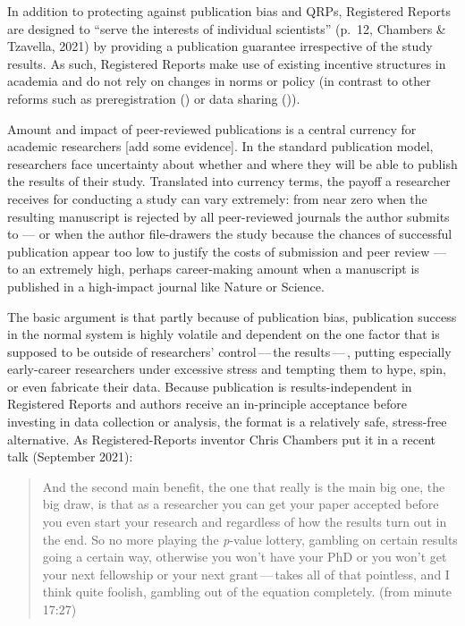 \documentclass[british,,man,floatsintext]{apa6}
\begin{document}
In addition to protecting against publication bias and QRPs, Registered Reports are designed to \enquote{serve the interests of individual scientists} (p.~12, Chambers \& Tzavella, 2021) by providing a publication guarantee irrespective of the study results.
As such, Registered Reports make use of existing incentive structures in academia and do not rely on changes in norms or policy (in contrast to other reforms such as preregistration () or data sharing ()).

Amount and impact of peer-reviewed publications is a central currency for academic researchers {[}add some evidence{]}. In the standard publication model, researchers face uncertainty about whether and where they will be able to publish the results of their study. Translated into currency terms, the payoff a researcher receives for conducting a study can vary extremely: from near zero when the resulting manuscript is rejected by all peer-reviewed journals the author submits to --- or when the author file-drawers the study because the chances of successful publication appear too low to justify the costs of submission and peer review --- to an extremely high, perhaps career-making amount when a manuscript is published in a high-impact journal like Nature or Science.

The basic argument is that partly because of publication bias, publication success in the normal system is highly volatile and dependent on the one factor that is supposed to be outside of researchers' control\(\,\)---\(\,\)the results\(\,\)---\(\,\), putting especially early-career researchers under excessive stress and tempting them to hype, spin, or even fabricate their data.
Because publication is results-independent in Registered Reports and authors receive an in-principle acceptance before investing in data collection or analysis, the format is a relatively safe, stress-free alternative.
As Registered-Reports inventor Chris Chambers put it in a recent talk (September 2021):

\begin{quote}
And the second main benefit, the one that really is the main big one, the big draw, is that as a researcher you can get your paper accepted before you even start your research and regardless of how the results turn out in the end. So no more playing the \emph{p}-value lottery, gambling on certain results going a certain way, otherwise you won't have your PhD or you won't get your next fellowship or your next grant\(\,\)---\(\,\)takes all of that pointless, and I think quite foolish, gambling out of the equation completely. (from minute 17:27)
\end{quote}
\end{document}
